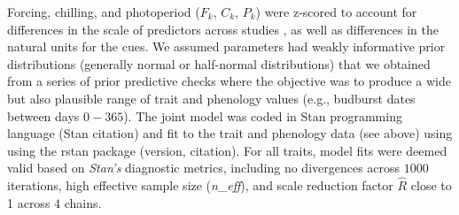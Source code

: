 \documentclass{article}\usepackage[]{graphicx}\usepackage[]{color}
\begin{document}
Forcing, chilling, and photoperiod ($F_k$, $C_k$, $P_k$) were z-scored to account for differences in the scale of predictors across studies \citep{Gelman2006}, as well as differences in the natural units for the cues. We assumed parameters had weakly informative prior distributions (generally normal or half-normal distributions) that we obtained from a series of prior predictive checks where the objective was to produce a wide but also plausible range of trait and phenology values (e.g., budburst dates between days $0-365$). The joint model was coded in Stan programming language (Stan citation) and fit to the trait and phenology data (see above) using using the rstan package (version, citation). For all traits, model fits were deemed valid based on \textit{Stan's} diagnostic metrics, including no divergences across $1000$ iterations, high effective sample size (\textit{n\_eff}), and scale reduction factor $\hat{R}$ close to 1 across $4$ chains.


\end{document}
